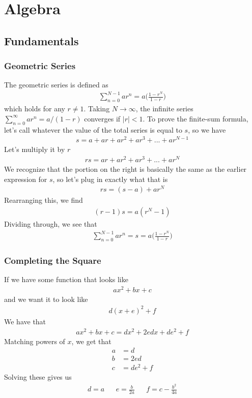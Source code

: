 \chapter{Algebra}

\section{Fundamentals}

\subsection{Geometric Series}
The geometric series is defined as 
\begin{align}
	\sum_{n=0}^{N-1} ar^n =a\Big( \frac{1-r^{N}}{1-r}\Big)
\end{align}
which holds for any $r \neq 1$. Taking $N \to \infty$, the infinite series $\sum_{n=0}^{\infty} ar^n = a/(1-r)$ converges if $|r| < 1$. To prove the finite-sum formula, let's call whatever the value of the total series is equal to $s$, so we have
\begin{align}
	s = a + ar + ar^2 + ar^3 + ... + ar^{N-1}
\end{align}
Let's multiply it by $r$
\begin{align}
	rs =  ar + ar^2 + ar^3 + ... + ar^{N}
\end{align}
We recognize that the portion on the right is basically the same as the earlier expression for $s$, so let's plug in exactly what that is
\begin{align}
	rs = (s - a) + ar^N
\end{align}
Rearranging this, we find
\begin{align}
	(r-1)s = a(r^N - 1)
\end{align}
Dividing through, we see that
\begin{align}
	\sum_{n=0}^{N-1} ar^n = s = a\Big( \frac{1-r^{N}}{1-r}\Big)
\end{align}


\subsection{Completing the Square}
If we have some function that looks like
\begin{align}
ax^2 + bx + c
\end{align}
and we want it to look like
\begin{align}
d(x+e)^2 + f
\end{align}
We have that 
\begin{align}
ax^2 + bx + c = dx^2 + 2ed x + de^2 + f
\end{align}
Matching powers of $x$, we get that
\begin{align}
a &= d\\
b &= 2ed\\
c &= de^2+f
\end{align}
Solving these gives us
\begin{align}
d = a && e =\frac{b}{2a}  && f = c-\frac{b^2}{4a}
\end{align}


